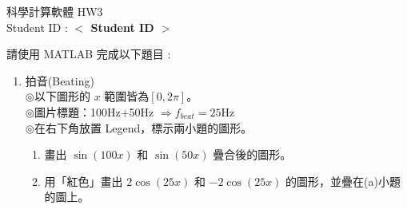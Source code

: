 \documentclass[12pt,a4paper]{article}
\newcommand{\placeholder}[1]{\textbf{$<$ #1 $>$}}
\newcommand{\idnumber}{\placeholder{Student ID}}
\begin{document}
\begin{CJK}{UTF8}{bsmi}
\begin{flushleft}科學計算軟體 HW3
\\Student ID : \idnumber{}\end{flushleft}

請使用 MATLAB 完成以下題目 : 
\begin{enumerate}
\item 拍音(Beating)\\
$\circledcirc$以下圖形的 $x$ 範圍皆為$[0,2\pi]$。\\
$\circledcirc$圖片標題：100Hz+50Hz $\Rightarrow f_{beat}=25$Hz\\
$\circledcirc$在右下角放置 Legend，標示兩小題的圖形。
\begin{enumerate} 
\item 畫出 $\sin(100x)$ 和 $\sin(50x)$ 疊合後的圖形。

\item 用「紅色」畫出 $2\cos(25x)$ 和 $-2\cos(25x)$ 的圖形，並疊在(a)小題的圖上。
\end{enumerate}
\end{enumerate}
\end{CJK}
\end{document}
